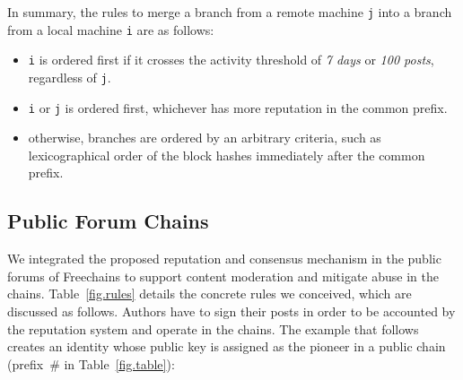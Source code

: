 \documentclass[12pt]{article}
\newcommand{\FC}       {Freechains\xspace}
\newcommand{\code}[1]  {\texttt{\footnotesize{#1}}}
\begin{document}
In summary, the rules to merge a branch from a remote machine \code{j} into a
branch from a local machine \code{i} are as follows:
\begin{itemize}
    \item \code{i} is ordered first if it crosses the activity threshold of
          \emph{7 days} or \emph{100 posts}, regardless of \code{j}.
    \item \code{i} or \code{j} is ordered first, whichever has more reputation
          in the common prefix.
    \item otherwise, branches are ordered by an arbitrary criteria, such as
          lexicographical order of the block hashes immediately after the
          common prefix.
\end{itemize}

\subsection{Public Forum Chains}
\label{sec.consensus.chains}

We integrated the proposed reputation and consensus mechanism in the public
forums of \FC to support content moderation and mitigate abuse in the chains.
Table~\ref{fig.rules} details the concrete rules we conceived, which are
discussed as follows.
Authors have to sign their posts in order to be accounted by the reputation
system and operate in the chains.
The example that follows creates an identity whose public key is assigned as
the pioneer in a public chain (prefix~$\#$ in Table~\ref{fig.table}):
\end{document}
